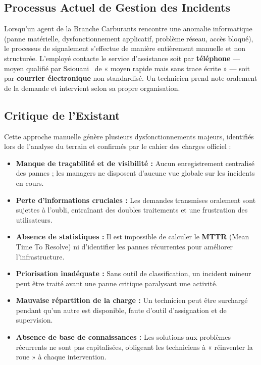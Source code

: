 \subsection{Processus Actuel de Gestion des Incidents}
Lorsqu'un agent de la Branche Carburants rencontre une anomalie informatique
(panne matérielle, dysfonctionnement applicatif, problème réseau, accès bloqué), le
processus de signalement s'effectue de manière entièrement manuelle et non structurée.
L'employé contacte le service d'assistance soit par \textbf{téléphone} — moyen qualifié
par Ssiouani~\cite{ssiouani2010} de « moyen rapide mais sans trace écrite » — soit par
\textbf{courrier électronique} non standardisé. Un technicien prend note oralement de la
demande et intervient selon sa propre organisation.

\subsection{Critique de l'Existant}
Cette approche manuelle génère plusieurs dysfonctionnements majeurs, identifiés lors
de l'analyse du terrain et confirmés par le cahier des charges officiel :
\begin{itemize}
    \item \textbf{Manque de traçabilité et de visibilité :} Aucun enregistrement
    centralisé des pannes ; les managers ne disposent d'aucune vue globale sur les
    incidents en cours.
    \item \textbf{Perte d'informations cruciales :} Les demandes transmises oralement
    sont sujettes à l'oubli, entraînant des doubles traitements et une frustration
    des utilisateurs.
    \item \textbf{Absence de statistiques :} Il est impossible de calculer le
    \textbf{MTTR} (Mean Time To Resolve) ni d'identifier les pannes récurrentes pour
    améliorer l'infrastructure.
    \item \textbf{Priorisation inadéquate :} Sans outil de classification, un incident
    mineur peut être traité avant une panne critique paralysant une activité.
    \item \textbf{Mauvaise répartition de la charge :} Un technicien peut être
    surchargé pendant qu'un autre est disponible, faute d'outil d'assignation et de
    supervision.
    \item \textbf{Absence de base de connaissances :} Les solutions aux problèmes
    récurrents ne sont pas capitalisées, obligeant les techniciens à « réinventer la roue »
    à chaque intervention.
\end{itemize}

